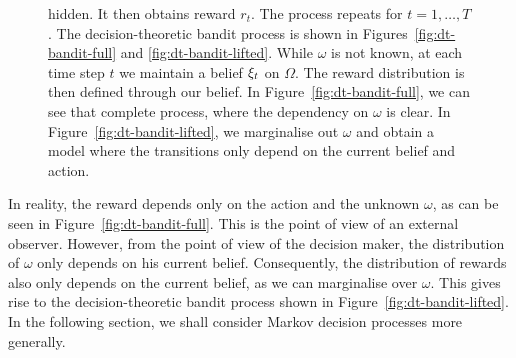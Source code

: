 \begin{figure}[htb]
{    hidden. It then obtains reward $r_t$. The process repeats for $t =
    1, \ldots, T$.  The decision-theoretic bandit process is shown in
    Figures~\ref{fig:dt-bandit-full} and
    \ref{fig:dt-bandit-lifted}. While $\omega$ is not known, at each
    time step $t$ we maintain a belief $\xi_t$ on $\Omega$. The
    reward distribution is then defined through our belief. In
    Figure~\ref{fig:dt-bandit-full}, we can see that complete process,
    where the dependency on $\omega$ is clear. In
    Figure~\ref{fig:dt-bandit-lifted}, we marginalise out $\omega$ and
    obtain a model where the transitions only depend on the current
    belief and action.}
  \label{fig:bandit-process}
\end{figure}

In reality, the reward depends only on the action and the unknown $\omega$, as can be seen in Figure~\ref{fig:dt-bandit-full}. This is the point of view of an external observer. However, from the point of view of the decision maker, the distribution of $\omega$ only depends on his current belief. Consequently, the distribution of rewards also only depends on the current belief, as we can marginalise over $\omega$. This gives rise to the decision-theoretic bandit process shown in Figure~\ref{fig:dt-bandit-lifted}.
In the following section, we shall consider Markov decision processes more generally.

